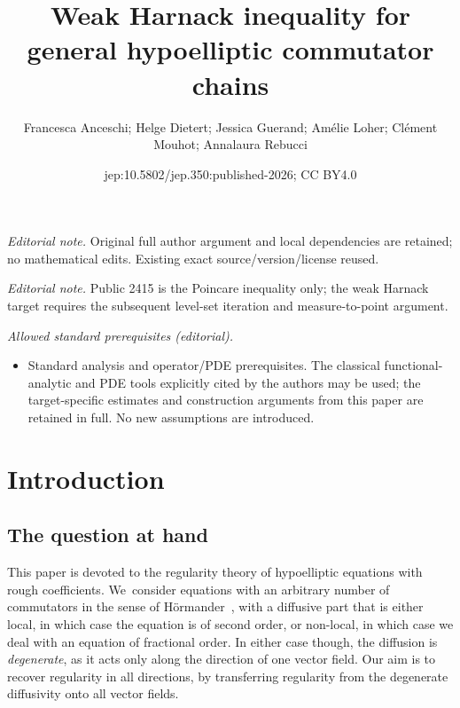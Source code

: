 \documentclass[10pt,a4paper]{amsart}
\title{Weak Harnack inequality for general hypoelliptic commutator chains}
\author{Francesca Anceschi; Helge Dietert; Jessica Guerand; Amélie Loher; Clément Mouhot; Annalaura Rebucci}
\date{jep:10.5802/jep.350:published-2026; CC BY4.0}
\theoremstyle{definition}
\begin{document}
\maketitle
\noindent\textit{Editorial note.} Original full author argument and local dependencies are retained; no mathematical edits. Existing exact source/version/license reused.\par\medskip
\noindent\textit{Editorial note.} Public 2415 is the Poincare inequality only; the weak Harnack target requires the subsequent level-set iteration and measure-to-point argument.\par\medskip
\noindent\textit{Allowed standard prerequisites (editorial).}\begin{itemize}
\item Standard analysis and operator/PDE prerequisites. The classical functional-analytic and PDE tools explicitly cited by the authors may be used; the target-specific estimates and construction arguments from this paper are retained in full. No new assumptions are introduced.
\end{itemize}\medskip
\section{Introduction}
\label{sec:intro}

\subsection{The question at hand}

This paper is devoted to the regularity theory of hypoelliptic
equations with rough coefficients. We~consider equations with an
arbitrary number of commutators in the sense of Hörmander~\cite{MR0222474},
with a diffusive part that is either local, in which case the equation is of second order,
or non-local, in which case we deal with an equation of fractional order. In either case though,
the diffusion is \textit{degenerate}, as it acts only along the direction of one vector field.
Our aim is to recover regularity in all directions, by transferring regularity from the degenerate diffusivity onto
all vector fields.
\end{document}
